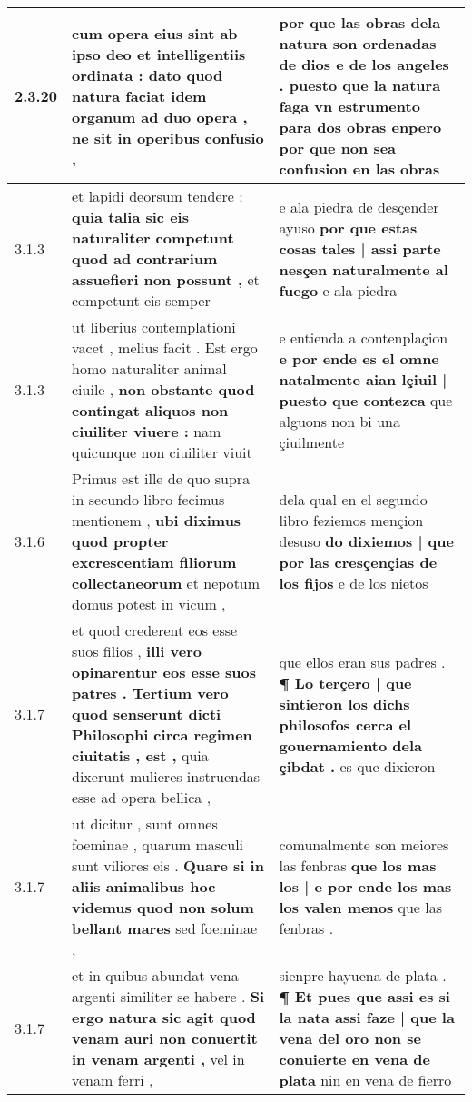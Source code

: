 \begin{tabular}{|p{1cm}|p{6.5cm}|p{6.5cm}|}
2.3.20 & cum opera eius sint ab ipso deo et intelligentiis ordinata : \textbf{ dato quod natura faciat idem organum ad duo opera , } ne sit in operibus confusio , & por que las obras dela natura son ordenadas de dios e de los angeles . \textbf{ puesto que la natura faga vn estrumento para dos obras enpero } por que non sea confusion en las obras \\\hline
3.1.3 & et lapidi deorsum tendere : \textbf{ quia talia sic eis naturaliter competunt quod ad contrarium assuefieri non possunt , } et competunt eis semper & e ala piedra de desçender ayuso \textbf{ por que estas cosas tales | assi parte nesçen naturalmente al fuego } e ala piedra \\\hline
3.1.3 & ut liberius contemplationi vacet , melius facit . Est ergo homo naturaliter animal ciuile , \textbf{ non obstante quod contingat aliquos non ciuiliter viuere : } nam quicunque non ciuiliter viuit & e entienda a contenplaçion \textbf{ e por ende es el omne natalmente aian lçiuil | puesto que contezca } que alguons non bi una çiuilmente \\\hline
3.1.6 & Primus est ille de quo supra in secundo libro fecimus mentionem , \textbf{ ubi diximus quod propter excrescentiam filiorum collectaneorum } et nepotum domus potest in vicum , & dela qual en el segundo libro feziemos mençion desuso \textbf{ do dixiemos | que por las cresçençias de los fijos } e de los nietos \\\hline
3.1.7 & et quod crederent eos esse suos filios , \textbf{ illi vero opinarentur eos esse suos patres . Tertium vero quod senserunt dicti Philosophi circa regimen ciuitatis , est , } quia dixerunt mulieres instruendas esse ad opera bellica , & que ellos eran sus padres . \textbf{ ¶ Lo terçero | que sintieron los dichs philosofos cerca el gouernamiento dela çibdat . } es que dixieron \\\hline
3.1.7 & ut dicitur , sunt omnes foeminae , quarum masculi sunt viliores eis . \textbf{ Quare si in aliis animalibus hoc videmus quod non solum bellant mares } sed foeminae , & comunalmente son meiores las fenbras \textbf{ que los mas los | e por ende los mas los valen menos } que las fenbras . \\\hline
3.1.7 & et in quibus abundat vena argenti similiter se habere . \textbf{ Si ergo natura sic agit quod venam auri non conuertit in venam argenti , } vel in venam ferri , & sienpre hayuena de plata . \textbf{ ¶ Et pues que assi es si la nata assi faze | que la vena del oro non se conuierte en vena de plata } nin en vena de fierro \\\hline

\end{tabular}

